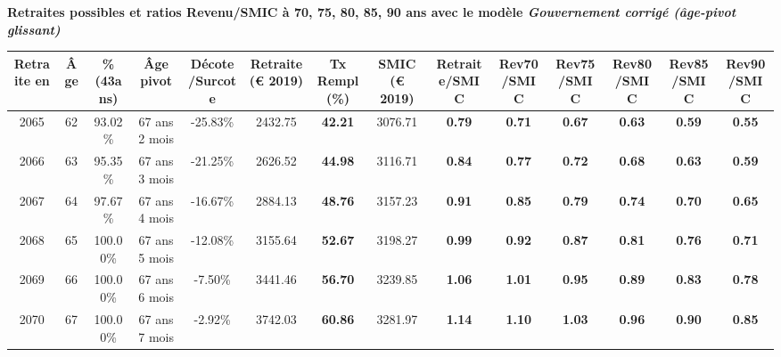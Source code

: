  \vspace{0.1cm} 
{\bf \noindent Retraites possibles et ratios Revenu/SMIC à 70, 75, 80, 85, 90 ans avec le modèle \emph{Gouvernement corrigé (âge-pivot glissant)}}  
 
\begin{adjustbox}{max width=\textwidth} 
\begin{tabular}[htb]{|c|c||c|c|c||c|c||c||c|c|c|c|c|c|} 
\hline 
 Retraite en &  Âge &  \%(43ans) &  Âge pivot &  Décote/Surcote &  Retraite (\euro{} 2019) &  Tx Rempl(\%) &  SMIC (\euro{} 2019) &  Retraite/SMIC &  Rev70/SMIC &  Rev75/SMIC &  Rev80/SMIC &  Rev85/SMIC &  Rev90/SMIC \\ 
\hline \hline 
 2065 &  62 &  93.02\% &  67 ans 2 mois &  -25.83\% &  2432.75 &  {\bf 42.21} &  3076.71 &  {\bf {\color{red} 0.79}} &  {\bf {\color{red} 0.71}} &  {\bf {\color{red} 0.67}} &  {\bf {\color{red} 0.63}} &  {\bf {\color{red} 0.59}} &  {\bf {\color{red} 0.55}} \\ 
\hline 
 2066 &  63 &  95.35\% &  67 ans 3 mois &  -21.25\% &  2626.52 &  {\bf 44.98} &  3116.71 &  {\bf {\color{red} 0.84}} &  {\bf {\color{red} 0.77}} &  {\bf {\color{red} 0.72}} &  {\bf {\color{red} 0.68}} &  {\bf {\color{red} 0.63}} &  {\bf {\color{red} 0.59}} \\ 
\hline 
 2067 &  64 &  97.67\% &  67 ans 4 mois &  -16.67\% &  2884.13 &  {\bf 48.76} &  3157.23 &  {\bf {\color{red} 0.91}} &  {\bf {\color{red} 0.85}} &  {\bf {\color{red} 0.79}} &  {\bf {\color{red} 0.74}} &  {\bf {\color{red} 0.70}} &  {\bf {\color{red} 0.65}} \\ 
\hline 
 2068 &  65 &  100.00\% &  67 ans 5 mois &  -12.08\% &  3155.64 &  {\bf 52.67} &  3198.27 &  {\bf {\color{red} 0.99}} &  {\bf {\color{red} 0.92}} &  {\bf {\color{red} 0.87}} &  {\bf {\color{red} 0.81}} &  {\bf {\color{red} 0.76}} &  {\bf {\color{red} 0.71}} \\ 
\hline 
 2069 &  66 &  100.00\% &  67 ans 6 mois &  -7.50\% &  3441.46 &  {\bf 56.70} &  3239.85 &  {\bf 1.06} &  {\bf 1.01} &  {\bf {\color{red} 0.95}} &  {\bf {\color{red} 0.89}} &  {\bf {\color{red} 0.83}} &  {\bf {\color{red} 0.78}} \\ 
\hline 
 2070 &  67 &  100.00\% &  67 ans 7 mois &  -2.92\% &  3742.03 &  {\bf 60.86} &  3281.97 &  {\bf 1.14} &  {\bf 1.10} &  {\bf 1.03} &  {\bf {\color{red} 0.96}} &  {\bf {\color{red} 0.90}} &  {\bf {\color{red} 0.85}} \\ 
\hline 
\hline 
\end{tabular} 
\end{adjustbox} 
 
